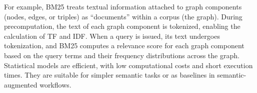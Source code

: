 {For example, BM25 treats textual information attached to graph components (nodes, edges, or triples) as ``documents'' within a corpus (the graph). 
During precomputation, the text of each graph component is tokenized, enabling the calculation of TF and IDF. 
When a query is issued, its text undergoes tokenization, 
and BM25 computes a relevance score for each graph component based on the query terms and their frequency distributions across the graph. 
Statistical models are efficient, with low computational costs and short execution times. They are suitable for simpler semantic tasks or as baselines in semantic-augmented workflows.






}
